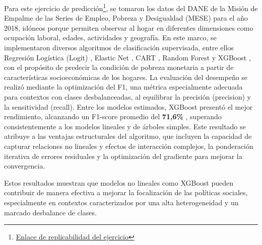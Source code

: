 Para este ejercicio de predicción\footnote{\href{https://github.com/alejandro-cardiles/PSET_2_BDML_2025_02_G2}{Enlace de replicabilidad del ejercicio}}, se tomaron los datos del DANE de la Misión de Empalme de las Series de Empleo, Pobreza y Desigualdad (MESE) para el año 2018, idóneos porque permiten observar al hogar en diferentes dimensiones como ocupación laboral, edades, actividades y geografía. En este marco, se implementaron diversos algoritmos de clasificación supervisada, entre ellos Regresión Logística (Logit) \cite{cox1958logit}, Elastic Net \cite{zou-2005}, CART \cite{breiman1984cart}, Random Forest \cite{breiman-2001} y XGBoost \cite{chen2016xgboost}, con el propósito de predecir la condición de pobreza monetaria a partir de características socioeconómicas de los hogares. La evaluación del desempeño se realizó mediante la optimización del F1, una métrica especialmente adecuada para contextos con clases desbalanceadas, al equilibrar la precisión (precision) y la sensitividad (recall). Entre los modelos estimados, XGBoost presentó el mejor rendimiento, alcanzando un F1-score promedio del \textbf{71,6\%} , superando consistentemente a los modelos lineales y de árboles simples. Este resultado se atribuye a las ventajas estructurales del algoritmo, que incluyen la capacidad de capturar relaciones no lineales y efectos de interacción complejos, la ponderación iterativa de errores residuales y la optimización del gradiente para mejorar la convergencia.

Estos resultados muestran que modelos no lineales como XGBoost pueden contribuir de manera efectiva a mejorar la focalización de las políticas sociales, especialmente en contextos caracterizados por una alta heterogeneidad y un marcado desbalance de clases.


